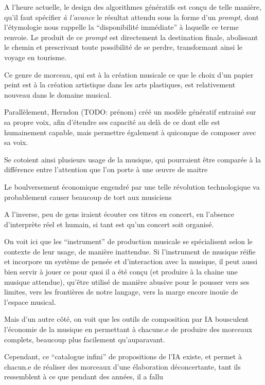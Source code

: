 A l'heure actuelle, le design des algorithmes génératifs est conçu de telle manière, qu'il faut spécifier \textit{à l'avance} le résultat attendu sous la forme d'un \textit{prompt}, dont l'étymologie nous rappelle la ``disponibilité immédiate'' à laquelle ce terme renvoie. Le produit de ce \textit{prompt} est directement la destination finale, abolissant le chemin et prescrivant toute possibilité de se perdre, transformant ainsi le voyage en tourisme.



Ce genre de morceau, qui est à la création musicale ce que le choix d'un papier peint est à la création artistique dans les arts plastiques, est relativement nouveau dans le domaine musical. 

Parallèlement, Herndon (TODO: prénom) créé un modèle génératif entrainé sur sa propre voix, afin d'étendre ses capacité au delà de ce dont elle est humainement capable, mais permettre également à quiconque de composer avec sa voix.

Se cotoient ainsi plusieurs usage de la musique, qui pourraient être comparée à la différence entre l'attention que l'on porte à une œuvre de maitre 

Le boulversement économique engendré par une telle révolution technologique va probablement causer beaucoup de tort aux musiciens

A l'inverse, peu de gens iraient écouter ces titres en concert, en l'absence d'interprète réel et humain, si tant est qu'un concert soit organisé.

On voit ici que les ``instrument'' de production musicale se spécialisent selon le contexte de leur usage, de manière inattendue.
Si l'instrument de musique réifie et incorpore un système de pensée et d'interaction avec la musique, il peut aussi bien servir à jouer ce pour quoi il a été conçu (et produire à la chaine une musique attendue), qu'être utilisé de manière abusive pour le pousser vers ses limites, vers les frontières de notre langage, vers la marge encore inouïe de l'espace musical.

Mais d'un autre côté, on voit que les outils de composition par IA bousculent l'économie de la musique en permettant à chacune.e de produire des morceaux complets, beaucoup plus facilement qu'auparavant.

Cependant, ce ``catalogue infini'' de propositions de l'IA existe, et permet à chacun.e de réaliser des morceaux d'une élaboration déconcertante, tant ils ressemblent à ce que pendant des années, il a fallu 

